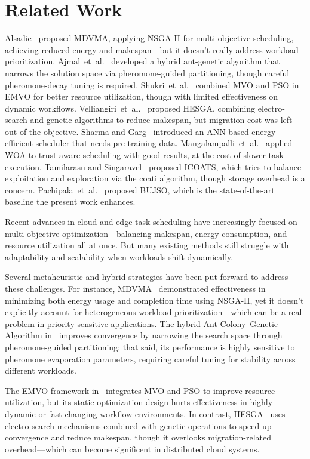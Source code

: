 \documentclass[journal]{IEEEtran}
\begin{document}
\section{Related Work}
\label{sec:related}

Alsadie~\cite{alsadie2021} proposed MDVMA, applying NSGA-II for multi-objective scheduling, achieving reduced energy and makespan---but it doesn't really address workload prioritization. Ajmal~et~al.~\cite{ajmal2021} developed a hybrid ant-genetic algorithm that narrows the solution space via pheromone-guided partitioning, though careful pheromone-decay tuning is required. Shukri~et~al.~\cite{shukri2021} combined MVO and PSO in EMVO for better resource utilization, though with limited effectiveness on dynamic workflows. Velliangiri~et~al.~\cite{velliangiri2021} proposed HESGA, combining electro-search and genetic algorithms to reduce makespan, but migration cost was left out of the objective. Sharma and Garg~\cite{sharma2020} introduced an ANN-based energy-efficient scheduler that needs pre-training data. Mangalampalli~et~al.~\cite{mangalampalli2023} applied WOA to trust-aware scheduling with good results, at the cost of slower task execution. Tamilarasu and Singaravel~\cite{tamilarasu2023} proposed ICOATS, which tries to balance exploitation and exploration via the coati algorithm, though storage overhead is a concern. Pachipala~et~al.~\cite{pachipala2024} proposed BUJSO, which is the state-of-the-art baseline the present work enhances.

Recent advances in cloud and edge task scheduling have increasingly focused on multi-objective optimization---balancing makespan, energy consumption, and resource utilization all at once. But many existing methods still struggle with adaptability and scalability when workloads shift dynamically.

Several metaheuristic and hybrid strategies have been put forward to address these challenges. For instance, MDVMA~\cite{alsadie2021} demonstrated effectiveness in minimizing both energy usage and completion time using NSGA-II, yet it doesn't explicitly account for heterogeneous workload prioritization---which can be a real problem in priority-sensitive applications. The hybrid Ant Colony--Genetic Algorithm in~\cite{ajmal2021} improves convergence by narrowing the search space through pheromone-guided partitioning; that said, its performance is highly sensitive to pheromone evaporation parameters, requiring careful tuning for stability across different workloads.

The EMVO framework in~\cite{shukri2021} integrates MVO and PSO to improve resource utilization, but its static optimization design hurts effectiveness in highly dynamic or fast-changing workflow environments. In contrast, HESGA~\cite{velliangiri2021} uses electro-search mechanisms combined with genetic operations to speed up convergence and reduce makespan, though it overlooks migration-related overhead---which can become significent in distributed cloud systems.
\end{document}
